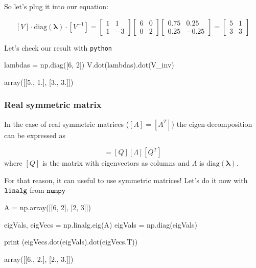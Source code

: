 So let's plug it into our equation:

\[ [V]\cdot\textrm{diag}(\boldsymbol{\lambda})\cdot [V^{−1}]=
\begin{bmatrix}
1 & 1 \\
1 &−3\end{bmatrix}
\begin{bmatrix}
6&0\\
0&2\end{bmatrix}
\begin{bmatrix}
0.75 & 0.25\\
0.25&-0.25 \end{bmatrix}
=\begin{bmatrix}
5 & 1\\
3& 3\end{bmatrix}
\]

Let's check our result with \texttt{python}

\begin{ipython}
lambdas = np.diag([6, 2])	
V.dot(lambdas).dot(V_inv)
\end{ipython}
\begin{ioutput}
array([[5., 1.],
       [3., 3.]])
\end{ioutput}

\subsubsection{Real symmetric matrix}
\label{real-symmetric-matrix}

In the case of real symmetric matrices (\([A]=[A^T]\)) the
eigen-decomposition can be expressed as

\begin{equation}
[A]=[Q][\Lambda][Q^T]
\end{equation} 
where \([Q]\) is the matrix with eigenvectors as columns and \(\Lambda\) is \(\textrm{diag}(\boldsymbol{\lambda})\).

For that reason, it can useful to use symmetric matrices! Let's do it now with \(\tt{linalg}\) from \(\tt{numpy}\)

\begin{ipython}
A = np.array([[6, 2], [2, 3]])

eigVals, eigVecs = np.linalg.eig(A)
eigVals = np.diag(eigVals)

print (eigVecs.dot(eigVals).dot(eigVecs.T))
\end{ipython}
\begin{ioutput}
array([[6., 2.],
       [2., 3.]])
\end{ioutput}

